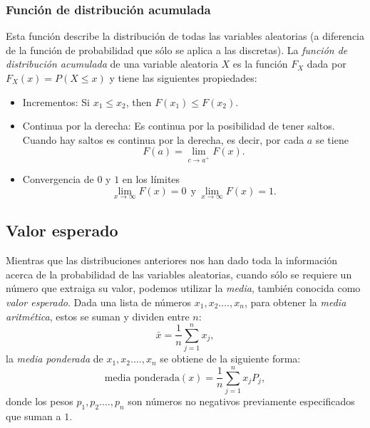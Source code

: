 \documentclass[letterpaper]{article}
\begin{document}
\subsubsection {Función de distribución acumulada}
Esta función describe la distribución de todas las variables aleatorias (a diferencia de la función de probabilidad que sólo se aplica a las discretas). La \emph{función de distribución acumulada} de una variable aleatoria $X$ es la función $F_X$ dada por $F_X(x)=P(X\leq x)$ y tiene las siguientes propiedades:
\begin{itemize}
    \item Incrementos: Si $x_1\leq x_2$, then $F(x_1)\leq F(x_2)$.
    \item Continua por la derecha: Es continua por la posibilidad de tener saltos. Cuando hay saltos es continua por la derecha, es decir, por cada $a$ se tiene
    \begin{equation}
    F(a)=\lim_{c\to a^+}F(x).
    \end{equation}
    \item Convergencia de $0$ y $1$ en los límites
    \begin{equation}
    \lim_{x\to \infty}F(x)=0\ \ \text{y}\ \lim_{x\to \infty}F(x)=1.
    \end{equation}
\end{itemize}
\subsection {Valor esperado}
Mientras que las distribuciones anteriores nos han dado toda la información acerca de la probabilidad de las variables aleatorias, cuando sólo se requiere un número que extraiga su valor, podemos utilizar la \emph{media}, también conocida como \emph{valor esperado}. Dada una lista de números $x_1,x_2.\ldots,x_n$, para obtener la \emph{media aritmética}, estos se suman y dividen entre $n$:
\begin{equation}
\bar{x}=\frac{1}{n}\sum_{j=1}^{n}x_j,
\end{equation}
la \emph{media ponderada} de $x_1,x_2.\ldots,x_n$ se obtiene de la siguiente forma:
\begin{equation}
\text{media ponderada}(x)=\frac{1}{n}\sum_{j=1}^{n}x_jP_j,
\end{equation}
donde los pesos $p_1,p_2.\ldots,p_n$ son números no negativos previamente especificados que suman a $1$.
\end{document}
